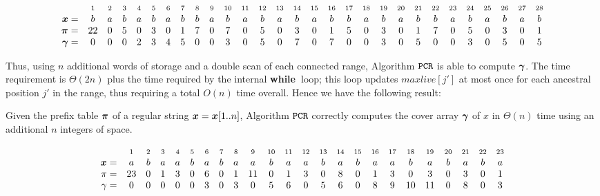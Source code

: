 \documentclass[runningheads,a4paper]{llncs}
\def\s#1{\mbox{\boldmath $#1$}}
\def\bwhile{{\bf while\ }}
\def\PCR{\tt{PCR}}
\begin{document}
\begin{equation}
\begin{array}{rccccccccccccccccccccccccccccc}
& \scriptstyle 1 & \scriptstyle 2 & \scriptstyle 3 & \scriptstyle 4 &
\scriptstyle 5 & \scriptstyle 6 & \scriptstyle 7 & \scriptstyle 8 & \scriptstyle 9 & \scriptstyle 10 & \scriptstyle 11 & \scriptstyle 12 & \scriptstyle 13 & \scriptstyle 14 & \scriptstyle 15 & \scriptstyle 16 & \scriptstyle 17 & \scriptstyle 18 & \scriptstyle 19 & \scriptstyle 20 & \scriptstyle 21 & \scriptstyle 22 & \scriptstyle 23 & \scriptstyle 24 & \scriptstyle 25 & \scriptstyle 26 & \scriptstyle 27 & \scriptstyle 28 \\
\s{x} = & b & a & b & a & b & a & b & b & a & b & a & b & a & b & a & b & b
& a & b & a & b & b & a & b & a & b & a & b \label{alice''} \\
\s{\pi} = & 22 & 0 & 5 & 0 & 3 & 0 & 1 & 7 & 0 & 7 & 0 & 5 & 0 & 3 & 0 & 1
& 5 & 0 & 3 & 0 & 1 & 7 & 0 & 5 & 0 & 3 & 0 & 1 \\
\s{\gamma} = & 0 & 0 & 0 & 2 & 3 & 4 & 5 & 0 & 0 & 3 & 0 & 5 & 0 & 7 & 0 &
7 & 0 & 0 & 3 & 0 & 5 & 0 & 0 & 3 & 0 & 5 & 0 & 5\\
\end{array}
\end{equation}


Thus, using $n$ additional words of storage and a double scan of each connected range,
Algorithm $\PCR$ is able to compute $\s{\gamma}$.
The time requirement is $\Theta(2n)$ plus the time required by the internal \bwhile loop;
this loop updates $maxlive[j']$ at most once for each ancestral position $j'$ in the range,
thus requiring a total $O(n)$ time overall. Hence we have the following result:

\bigskip
\begin{theorem}
Given the prefix table $\s{\pi}$ of a regular string $\s{x} = \s{x}[1..n]$,
Algorithm $\PCR$ correctly computes the cover array $\s{\gamma}$ of \s{x}
in $\Theta(n)$ time using an additional $n$ integers of space.
\end{theorem}

\begin{equation}
\label{org-string}
\begin{array}{ r c c c c c c c c c c c c c c c c c c c c c c c}
 &\scriptstyle1 & \scriptstyle 2 & \scriptstyle 3 & \scriptstyle
4 & \scriptstyle 5 & \scriptstyle 6 & \scriptstyle 7 & \scriptstyle
8 & \scriptstyle 9 & \scriptstyle 10 & \scriptstyle 11 & \scriptstyle
12 & \scriptstyle 13 & \scriptstyle 14 & \scriptstyle 15 & \scriptstyle
16 & \scriptstyle 17 & \scriptstyle 18 & \scriptstyle 19 & \scriptstyle
20 & \scriptstyle 21 & \scriptstyle 22 & \scriptstyle 23 \\
\s{x} = &a&b&a&a&b&a&b&a&a&b&a&a&b&a&b&a&a&b&a&b&a&b&a\\
\pi  = &23&0&1&3&0&6&0&1&11&0&1&3&0&8&0&1&3&0&3&0&3&0&1\\
\gamma = &0&0&0&0&0&3&0&3&0&5&6&0&5&6&0&8&9&10&11&0&8&0&3\\
\end{array} 
\end{equation}
\end{document}
